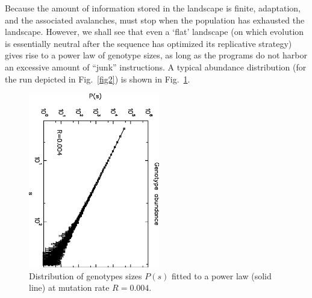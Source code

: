 \documentclass[letterpaper]{article}
\begin{document}
\begin{table}[h]
\vskip 0.25cm
\caption{Logical calculations on random inputs $A$ and $B$ rewarded,
bonuses, and difficulty (in minimum number of {\tt nand} instructions
required). Bonuses $b_i$ increase the speed of a CPU by a factor
$\nu_i=1+2^{b_i-3}$.}
\end{table}

Because the amount of information stored in the landscape is finite,
adaptation, and the associated avalanches, must stop when the
population has exhausted the landscape.  However, we shall see that
even a `flat' landscape (on which evolution is essentially neutral
after the sequence has optimized its replicative strategy) gives rise
to a power law of genotype sizes, as long as the programs do not
harbor an excessive amount of ``junk'' instructions.  A typical
abundance distribution (for the run depicted in Fig.~\ref{fig2}) is
shown in Fig.~\ref{fig3}.


\begin{figure}[ht]
\begin{center}
\includegraphics[width=2.25in, angle=90]{fig3.eps}
\caption{Distribution of genotypes sizes $P(s)$ fitted to a power law
  (solid line) at mutation rate $R=0.004$.}
\label{fig3}
\end{center}
\end{figure}
\end{document}
